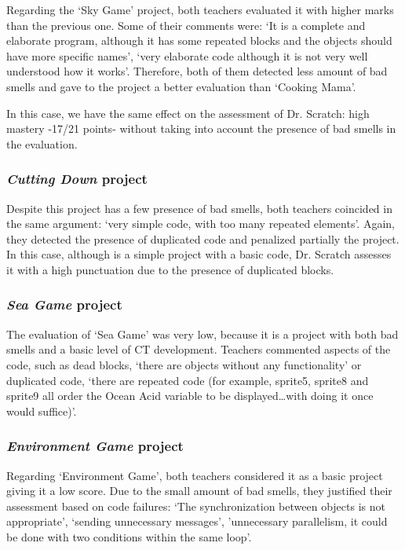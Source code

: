 Regarding the `Sky Game' project, both teachers evaluated it with higher marks than the previous one. Some of their comments were: `It is a complete and elaborate program, although it has some repeated blocks and the objects should have more specific names', `very elaborate code although it is not very well understood how it works'. Therefore, both of them detected less amount of bad smells and gave to the project a better evaluation than `Cooking Mama'. 

In this case, we have the same effect on the assessment of Dr. Scratch: high mastery -17/21 points- without taking into account the presence of bad smells in the evaluation.

\subsubsection{\textit{Cutting Down} project}
\label{subsub:cutting_down}

Despite this project has a few presence of bad smells, both teachers coincided in the same argument: `very simple code, with too many repeated elements'. Again, they detected the presence of duplicated code and penalized partially the project. In this case, although is a simple project with a basic code, Dr. Scratch assesses it with a high punctuation due to the presence of duplicated blocks. 

\subsubsection{\textit{Sea Game} project}
\label{subsub:sea_game}

The evaluation of `Sea Game' was very low, because it is a project with both bad smells and a basic level of CT development. Teachers commented aspects of the code, such as dead blocks, `there are objects without any functionality' or duplicated code, `there are repeated code (for example, sprite5, sprite8 and sprite9 all order the Ocean Acid variable to be displayed\ldots with doing it once would suffice)'. 


\subsubsection{\textit{Environment Game} project}
\label{subsub:environment_game}

Regarding `Environment Game', both teachers considered it as a basic project giving it a low score. Due to the small amount of bad smells, they justified their assessment based on code failures: `The synchronization between objects is not appropriate', `sending unnecessary messages', 'unnecessary parallelism, it could be done with two conditions within the same loop'.

